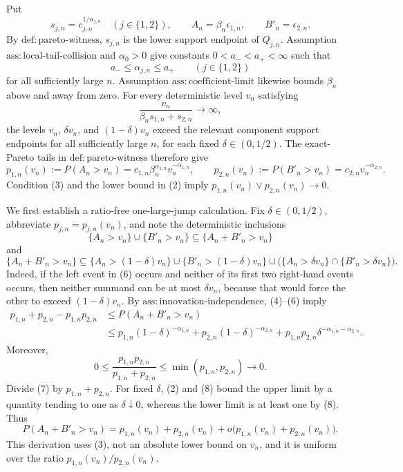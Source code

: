 Put
\[
s_{j,n}=c_{j,n}^{1/\alpha_{j,n}}\quad(j\in\{1,2\}),
\qquad A_n=\beta_n\epsilon_{1,n},
\qquad B'_n=\epsilon_{2,n}.
\tag{1}
\]
By \(\mathrm{def{:}pareto\text{-}witness}\), \(s_{j,n}\) is the lower support endpoint of \(Q_{j,n}\). Assumption \(\mathrm{ass{:}local\text{-}tail\text{-}collision}\) and \(\alpha_0>0\) give constants \(0<a_-<a_+<\infty\) such that
\[
a_-\leq\alpha_{j,n}\leq a_+
\qquad(j\in\{1,2\})
\tag{2}
\]
for all sufficiently large \(n\). Assumption \(\mathrm{ass{:}coefficient\text{-}limit}\) likewise bounds \(\beta_n\) above and away from zero. For every deterministic level \(v_n\) satisfying
\[
\frac{v_n}{\beta_ns_{1,n}+s_{2,n}}\to\infty,
\tag{3}
\]
the levels \(v_n\), \(\delta v_n\), and \((1-\delta)v_n\) exceed the relevant component support endpoints for all sufficiently large \(n\), for each fixed \(\delta\in(0,1/2)\). The exact-Pareto tails in \(\mathrm{def{:}pareto\text{-}witness}\) therefore give
\[
p_{1,n}(v_n):=P(A_n>v_n)
=c_{1,n}\beta_n^{\alpha_{1,n}}v_n^{-\alpha_{1,n}},
\qquad
p_{2,n}(v_n):=P(B'_n>v_n)
=c_{2,n}v_n^{-\alpha_{2,n}}.
\tag{4}
\]
Condition (3) and the lower bound in (2) imply \(p_{1,n}(v_n)\vee p_{2,n}(v_n)\to0\).

We first establish a ratio-free one-large-jump calculation. Fix \(\delta\in(0,1/2)\), abbreviate \(p_{j,n}=p_{j,n}(v_n)\), and note the deterministic inclusions
\[
\{A_n>v_n\}\cup\{B'_n>v_n\}
\subseteq\{A_n+B'_n>v_n\}
\tag{5}
\]
and
\[
\{A_n+B'_n>v_n\}
\subseteq
\{A_n>(1-\delta)v_n\}\cup\{B'_n>(1-\delta)v_n\}
\cup\bigl(\{A_n>\delta v_n\}\cap\{B'_n>\delta v_n\}\bigr).
\tag{6}
\]
Indeed, if the left event in (6) occurs and neither of its first two right-hand events occurs, then neither summand can be at most \(\delta v_n\), because that would force the other to exceed \((1-\delta)v_n\). By \(\mathrm{ass{:}innovation\text{-}independence}\), (4)--(6) imply
\[
\begin{split}
p_{1,n}+p_{2,n}-p_{1,n}p_{2,n}
&\leq P(A_n+B'_n>v_n)\\
&\leq p_{1,n}(1-\delta)^{-\alpha_{1,n}}
+p_{2,n}(1-\delta)^{-\alpha_{2,n}}
+p_{1,n}p_{2,n}\delta^{-\alpha_{1,n}-\alpha_{2,n}}.
\end{split}
\tag{7}
\]
Moreover,
\[
0\leq\frac{p_{1,n}p_{2,n}}{p_{1,n}+p_{2,n}}
\leq\min(p_{1,n},p_{2,n})\to0.
\tag{8}
\]
Divide (7) by \(p_{1,n}+p_{2,n}\). For fixed \(\delta\), (2) and (8) bound the upper limit by a quantity tending to one as \(\delta\downarrow0\), whereas the lower limit is at least one by (8). Thus
\[
P(A_n+B'_n>v_n)
=p_{1,n}(v_n)+p_{2,n}(v_n)
+o\bigl(p_{1,n}(v_n)+p_{2,n}(v_n)\bigr).
\tag{9}
\]
This derivation uses (3), not an absolute lower bound on \(v_n\), and it is uniform over the ratio \(p_{1,n}(v_n)/p_{2,n}(v_n)\).


